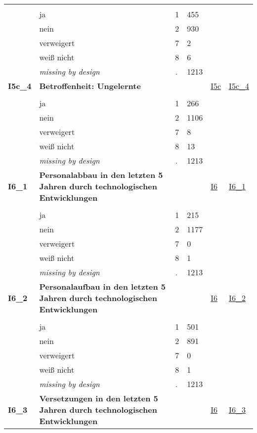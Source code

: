 \begin{longtable}{| L{2.45cm} | L{6cm} | C{1.5cm} | R{1cm} | C{2.25cm} | C{2.25cm} |}
   &  &  &  &  &  \\ 
   & ja & 1 & 455 &  &  \\ 
   & nein & 2 & 930 &  &  \\ 
   & verweigert & 7 & 2 &  &  \\ 
   & weiß nicht & 8 & 6 &  &  \\ 
   & \textit{missing by design} & \textit{.} & 1213 &  &  \\ 
   \midrule
\textbf{I5c\_4}\label{var:I5c:4} & \textbf{Betroffenheit: Ungelernte} &  &  & \hyperref[I5c]{I5c} & \hyperref[var:suf:I5c:4]{I5c\_4} \\ 
   &  &  &  &  &  \\ 
   & ja & 1 & 266 &  &  \\ 
   & nein & 2 & 1106 &  &  \\ 
   & verweigert & 7 & 8 &  &  \\ 
   & weiß nicht & 8 & 13 &  &  \\ 
   & \textit{missing by design} & \textit{.} & 1213 &  &  \\ 
   \midrule
\textbf{I6\_1}\label{var:I6:1} & \textbf{Personalabbau in den letzten 5 Jahren durch technologischen Entwicklungen} &  &  & \hyperref[I6]{I6} & \hyperref[var:suf:I6:1]{I6\_1} \\ 
   &  &  &  &  &  \\ 
   & ja & 1 & 215 &  &  \\ 
   & nein & 2 & 1177 &  &  \\ 
   & verweigert & 7 & 0 &  &  \\ 
   & weiß nicht & 8 & 1 &  &  \\ 
   & \textit{missing by design} & \textit{.} & 1213 &  &  \\ 
   \midrule
\textbf{I6\_2}\label{var:I6:2} & \textbf{Personalaufbau in den letzten 5 Jahren durch technologischen Entwicklungen} &  &  & \hyperref[I6]{I6} & \hyperref[var:suf:I6:2]{I6\_2} \\ 
   &  &  &  &  &  \\ 
   & ja & 1 & 501 &  &  \\ 
   & nein & 2 & 891 &  &  \\ 
   & verweigert & 7 & 0 &  &  \\ 
   & weiß nicht & 8 & 1 &  &  \\ 
   & \textit{missing by design} & \textit{.} & 1213 &  &  \\ 
   \midrule
\textbf{I6\_3}\label{var:I6:3} & \textbf{Versetzungen in den letzten 5 Jahren durch technologischen Entwicklungen} &  &  & \hyperref[I6]{I6} & \hyperref[var:suf:I6:3]{I6\_3} \\ 

\end{longtable}
